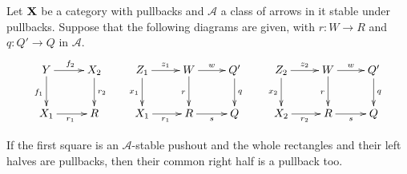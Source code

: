 \begin{lemma}\label{lem:pb2}
	Let $\textbf {\textup{X}}$ be a category with pullbacks and $\mathcal{A}$  a class of arrows in it  stable under pullbacks. Suppose that  the following diagrams are given, with $r\colon W\to R$ and $q\colon Q'\to Q$ in $\mathcal{A}$.
	\[
	\xymatrix{Y\ar[r]^{f_2} \ar[d]_{f_1} & X_2 \ar[d]^{r_2} & Z_1 \ar[d]_{x_1}\ar[r]^{z_1} & W \ar[r]^{w} \ar[d]_{r} & Q'\ar[d]^{q} & Z_2 \ar[d]_{x_2} \ar[r]^{z_2}  & W  \ar[r]^{w} \ar[d]_{r}  & Q' \ar[d]^{q}\\ X_1 \ar[r]_{r_1} &R  & X_1 \ar[r]_{r_1} & R \ar[r]_{s}  & Q& X_2 \ar[r]_{r_2} & R \ar[r]_{s} & Q}\]
	
	If the first square is an $\mathcal{A}$-stable pushout and the whole rectangles and their left halves are pullbacks, then their common right half is a pullback too.
\end{lemma}
